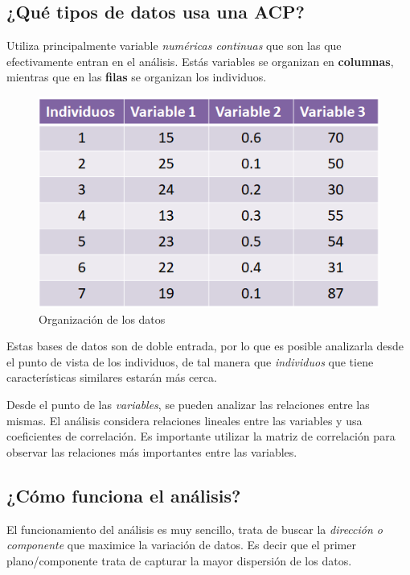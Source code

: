 \documentclass[
]{book}
\begin{document}
\hypertarget{quuxe9-tipos-de-datos-usa-una-acp}{%
\subsection{¿Qué tipos de datos usa una ACP?}\label{quuxe9-tipos-de-datos-usa-una-acp}}

Utiliza principalmente variable \emph{numéricas continuas} que son las que efectivamente entran en el análisis. Estás variables se organizan en \textbf{columnas}, mientras que en las \textbf{filas} se organizan los individuos.

\begin{figure}
\centering
\includegraphics{./images/organi.png}
\caption{Organización de los datos}
\end{figure}

Estas bases de datos son de doble entrada, por lo que es posible analizarla desde el punto de vista de los individuos, de tal manera que \emph{individuos} que tiene características similares estarán más cerca.

Desde el punto de las \emph{variables}, se pueden analizar las relaciones entre las mismas. El análisis considera relaciones lineales entre las variables y usa coeficientes de correlación. Es importante utilizar la matriz de correlación para observar las relaciones más importantes entre las variables.

\hypertarget{cuxf3mo-funciona-el-anuxe1lisis}{%
\subsection{¿Cómo funciona el análisis?}\label{cuxf3mo-funciona-el-anuxe1lisis}}

El funcionamiento del análisis es muy sencillo, trata de buscar la \emph{dirección o componente} que maximice la variación de datos. Es decir que el primer plano/componente trata de capturar la mayor dispersión de los datos.
\end{document}
